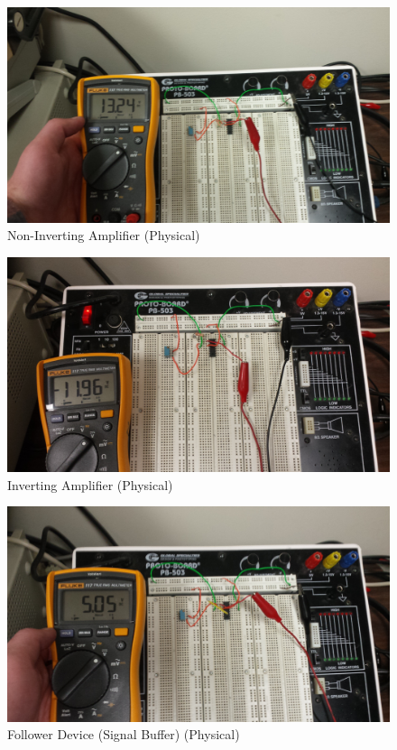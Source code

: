 \documentclass[12pt]{article}
\begin{document}
\begin{figure}[h!] %
   \centering
   \includegraphics[width=5.5in]{non_inverting_physical.jpg} 
   \caption{Non-Inverting Amplifier (Physical)}
   \label{fig:example}
\end{figure}

\newpage

\begin{figure}[h!] %
   \centering
   \includegraphics[width=\linewidth]{inverting_physical.jpg} 
   \caption{Inverting Amplifier (Physical)}
   \label{fig:example}
\end{figure}
\bigskip

\begin{figure}[h!] %
   \centering
   \includegraphics[width=\linewidth]{follower_physical.jpg} 
   \caption{Follower Device (Signal Buffer) (Physical)}
   \label{fig:example}
\end{figure}
\end{document}
